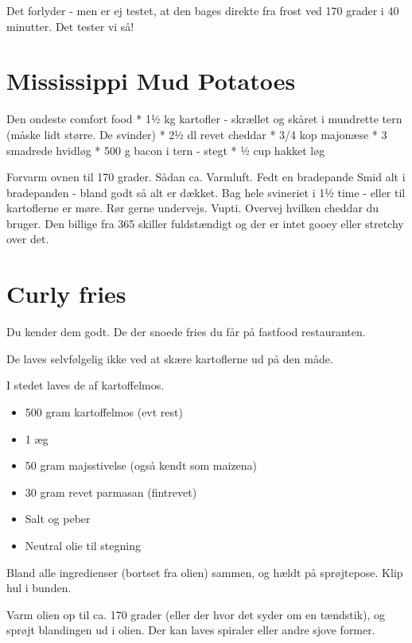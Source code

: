 \documentclass[
]{book}
\providecommand{\tightlist}{%
  \setlength{\itemsep}{0pt}\setlength{\parskip}{0pt}}
\begin{document}
Det forlyder - men er ej testet, at den bages direkte fra
frost ved 170 grader i 40 minutter.
Det tester vi så!

\hypertarget{mississippi-mud-potatoes}{%
\section{Mississippi Mud Potatoes}\label{mississippi-mud-potatoes}}

Den ondeste comfort food
* 1½ kg kartofler - skrællet og skåret i mundrette tern (måske lidt større. De svinder)
* 2½ dl revet cheddar
* 3/4 kop majonæse
* 3 smadrede hvidløg
* 500 g bacon i tern - stegt
* ½ cup hakket løg

Forvarm ovnen til 170 grader. Sådan ca. Varmluft.
Fedt en bradepande
Smid alt i bradepanden - bland godt så alt er dækket.
Bag hele svineriet i 1½ time - eller til kartoflerne er møre.
Rør gerne undervejs.
Vupti. Overvej hvilken cheddar du bruger. Den billige fra 365 skiller
fuldstændigt og der er intet gooey eller stretchy over det.

\hypertarget{curly-fries}{%
\section{Curly fries}\label{curly-fries}}

Du kender dem godt. De der snoede fries du får på fastfood restauranten.

De laves selvfølgelig ikke ved at skære kartoflerne ud på den måde.

I stedet laves de af kartoffelmos.

\begin{itemize}
\tightlist
\item
  500 gram kartoffelmos (evt rest)
\item
  1 æg
\item
  50 gram majsstivelse (også kendt som maizena)
\item
  30 gram revet parmasan (fintrevet)
\item
  Salt og peber
\item
  Neutral olie til stegning
\end{itemize}

Bland alle ingredienser (bortset fra olien) sammen, og hældt på sprøjtepose. Klip hul i bunden.

Varm olien op til ca. 170 grader (eller der hvor det syder om en tændstik), og sprøjt blandingen ud i olien. Der kan laves spiraler eller andre sjove former.
\end{document}
